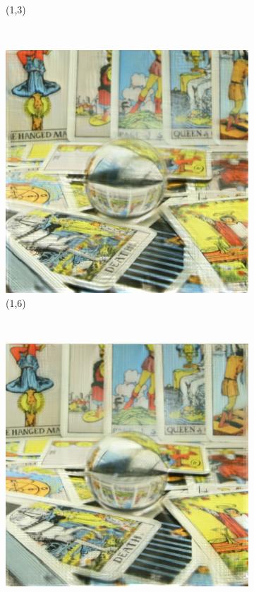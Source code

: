 \documentclass[11pt,a4paper,titlepage]{article}
\begin{document}
\begin{figure}
\begin{subfigure}[t]{0.3\textwidth}
		\caption{(1,3)}
	\end{subfigure}%
	~
	\begin{subfigure}[t]{0.3\textwidth}
		\includegraphics[width=\textwidth]{results/tile_blending/tarot6x6x512x512-512x512x5-sampling=2x_tileRes=200x200_overlap=0.5/Reconstruction_of_view_(1,6).png} 
		\caption{(1,6)}
	\end{subfigure}%
	\\
	\begin{subfigure}[t]{0.3\textwidth}
		\includegraphics[width=\textwidth]{results/tile_blending/tarot6x6x512x512-512x512x5-sampling=2x_tileRes=200x200_overlap=0.5/Reconstruction_of_view_(3,1).png}

\end{subfigure}
\end{figure}
\end{document}
